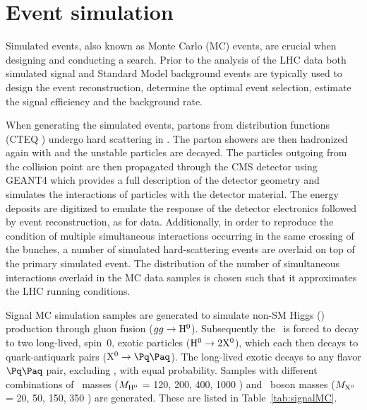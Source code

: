 \section{Event simulation}

Simulated events, also known as Monte Carlo (MC) events, are crucial when 
designing and conducting a search. Prior to the analysis of the LHC data 
both simulated signal and Standard Model background events
are typically used to design the event reconstruction, determine the optimal 
event selection, estimate the signal efficiency and the background rate.

When generating the simulated events, partons from distribution functions 
(CTEQ \cite{Bourilkov:2006cj}) undergo hard scattering in \PYTHIA \cite{PYTHIA}. 
The parton showers are then hadronized again with \PYTHIA and the unstable particles are decayed.
The particles outgoing from the collision point are then propagated through the CMS detector 
using GEANT4 \cite{GEANT4} which provides a full description of the detector geometry
and simulates
the interactions of particles with the detector material. The energy deposits are digitized
to emulate the response of the detector electronics followed by event reconstruction,
as for data. Additionally, in order to reproduce the 
condition of multiple simultaneous interactions occurring in the same crossing of the 
bunches, a number of simulated hard-scattering events are overlaid on top of the primary 
simulated event. The distribution of the number of simultaneous interactions overlaid in the
MC data samples is chosen such that it approximates the LHC running conditions.

Signal MC simulation samples are generated to
simulate non-SM Higgs (\Higgs) production through gluon fusion ($gg \to \mathrm{H}^{0}$). 
Subsequently the \Higgs~is forced to decay to two long-lived, spin~0, exotic particles
($\mathrm{H}^{0} \to 2\mathrm{X^{0}}$), which each then decays to quark-antiquark pairs ($\X \to \qq$).
The long-lived exotic \X decays to any flavor $\qq$ pair, excluding \ttbar, with equal probability. Samples
with different combinations of \Higgs~masses ($M_{\mathrm{H}^{0}}$ = 120, 200, 400, 1000 \GeV ) and \X~boson masses
($M_{\mathrm{X^{0}}}$ = 20, 50, 150, 350 \GeV) are generated. These are listed in Table~\ref{tab:signalMC}.

